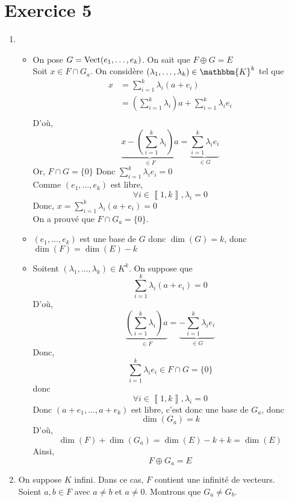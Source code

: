 \part{Exercice 5}

\begin{enumerate}
	\item 
		\begin{itemize}
			\item On pose $G = \operatorname{Vect}(e_1, \ldots, e_k)$. On sait que $F \oplus G = E$ \\
				Soit $x \in F \cap G_a$. On considère $(\lambda_1, \ldots, \lambda_k) \in \mathbbm{K}^k$ tel que
				\begin{align*}
					x &= \sum_{i=1}^k \lambda_i (a + e_i)\\
					&= \left( \sum_{i=1}^k \lambda_i \right)a + \sum_{i=1}^k \lambda_i e_i \\
				\end{align*}
				D'où, \[
					\underbrace{x - \left( \sum_{i=1}^k \lambda_i \right)a}_{\in F} = \underbrace{\sum_{i=1}^k \lambda_i e_i}_{\in G}
				\]
				Or, $F \cap G = \{0\}$ Donc $\sum_{i=1}^k \lambda_i e_i = 0$ \\
				Comme $(e_1, \ldots, e_k)$ est libre, \[
					\forall i \in \left\llbracket 1,k \right\rrbracket , \lambda_i = 0
				\] Donc, $x = \sum_{i=1}^k \lambda_i (a + e_i) = 0$ \\
				On a prouvé que $F \cap G_a = \{0\}$.
			\item $(e_1, \ldots, e_k)$ est une base de $G$ donc $\dim(G) = k$, donc $\dim(F) = \dim(E) - k$ 
			\item Soitent $(\lambda_1, \ldots, \lambda_k) \in K^k$. On suppose que \[
					\sum_{i=1}^k \lambda_i (a + e_i) = 0
				\] 
				D'où, \[
					\underbrace{\left(\sum_{i=1}^k \lambda_i\right)a}_{\in F} = \underbrace{-\sum_{i=1}^k \lambda_i e_i}_{\in G}
				\] Donc, \[
					\sum_{i=1}^{k} \lambda_i e_i \in F\cap G = \{0\}
				\] donc \[
					\forall i \in \left\llbracket 1,k \right\rrbracket, \lambda_i = 0
				\] Donc $(a + e_1, \ldots, a + e_k)$ est libre, c'est donc une base de $G_a$, donc \[
					\dim(G_a) = k
				\] D'où, \[
					\dim(F) + \dim(G_a) = \dim(E) - k + k = \dim(E)
				\] Ainsi, \[
					F \oplus G_a = E
				\]
		\end{itemize}
	\item On suppose $K$ infini. Dans ce cas, $F$ contient une infinité de vecteurs.\\
		Soient $a, b \in F$ avec $a \neq b$ et $a \neq 0$. Montrons que $G_a \neq G_b$.\\

\end{enumerate}
